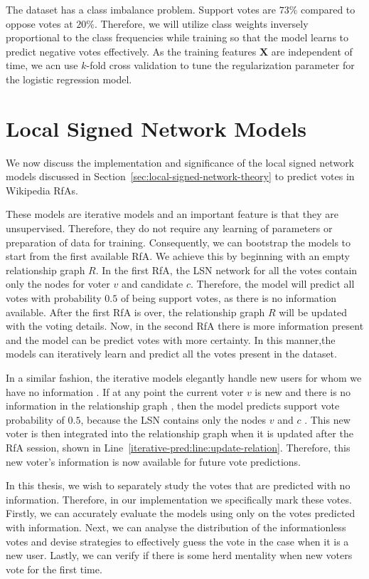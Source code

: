 The \wikirfa dataset has a class imbalance problem.
Support votes are $73\%$ compared to oppose votes at $20\%$.
Therefore, we will utilize class weights inversely proportional to the class frequencies while training so that the model learns to predict negative votes effectively. 
As the training features $\mathbf{X}$ are independent of time, we acn use $k$-fold cross validation to tune the regularization parameter for the logistic regression model.  

\section{Local Signed Network Models}
\label{sec:local-signed-network-implementation}
We now discuss the implementation and significance of the local signed network models discussed in Section~\ref{sec:local-signed-network-theory} to predict votes in Wikipedia RfAs.

These models are iterative models and an important feature is that they are unsupervised.
Therefore, they do not require any learning of parameters or preparation of data for training.
Consequently, we can bootstrap the models to start from the first available RfA.
We achieve this by beginning with an empty relationship graph $R$.
In the first RfA, the LSN network for all the votes contain only the nodes for voter $v$ and candidate $c$.
Therefore, the model will predict all votes with probability $0.5$ of being support votes, as there is no information available.
After the first RfA is over, the relationship graph $R$ will be updated with the voting details.
Now, in the second RfA there is more information present and the model can be predict votes with more certainty.
In this manner,the models can iteratively learn and predict all the votes present in the \wikirfa dataset.

In a similar fashion, the iterative models elegantly handle new users for whom we have no information .
If at any point the current voter $v$ is new and there is no information in the relationship graph , then the model predicts support vote probability of $0.5$, because the LSN contains only the nodes $v$ and $c$ .
This new voter is then integrated into the relationship graph when it is updated after the RfA session, shown in Line~\ref{iterative-pred:line:update-relation}.
Therefore, this new voter's information is now available for future vote predictions.

In this thesis, we wish to separately study the votes that are predicted with no information.
Therefore, in our implementation we specifically mark these votes.
Firstly, we can accurately evaluate the models using only on the votes predicted with information.
Next, we can analyse the distribution of the informationless votes and devise strategies to effectively guess the vote in the case when it is a new user.
Lastly, we can verify if there is some herd mentality when new voters vote for the first time.

